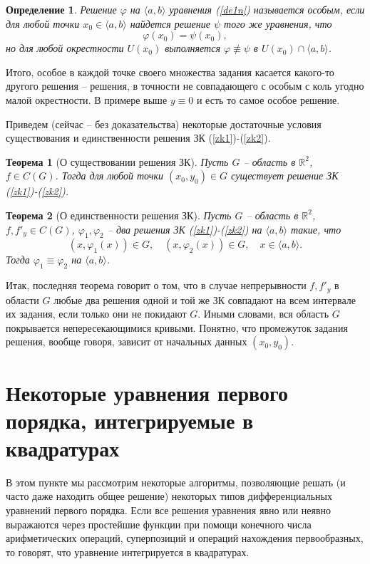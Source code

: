 \documentclass[a4paper,14pt]{extarticle}
\newtheorem{theorem}{Теорема}[subsection]
\newtheorem{definition}{Определение}[subsection]
\begin{document}
\begin{definition}
Решение $\varphi$ на $\langle a, b \rangle$ уравнения (\ref{de1n}) называется особым, если для любой точки $x_0 \in \langle a, b \rangle$ найдется решение $\psi$ того же уравнения, что
$$
\varphi(x_0) = \psi(x_0),
$$
но для любой окрестности $U(x_0)$ выполняется $\varphi \not\equiv \psi$ в $U(x_0) \cap \langle a, b \rangle$.
\end{definition}
Итого, особое в каждой точке своего множества задания касается какого-то другого решения -- решения, в точности не совпадающего с особым с коль угодно малой окрестности. В примере выше $y \equiv 0$ и есть то самое особое решение.

Приведем (сейчас -- без доказательства) некоторые достаточные условия существования и единственности решения ЗК (\ref{zk1})-(\ref{zk2}).
\begin{theorem}[О существовании решения ЗК]
	Пусть $G$ -- область в $\mathbb R^2$, $f \in C(G)$. Тогда для любой точки $(x_0, y_0) \in G$ существует решение ЗК (\ref{zk1})-(\ref{zk2}).
\end{theorem}
\begin{theorem}[О единственности решения ЗК]
	Пусть $G$ -- область в $\mathbb R^2$, $f, f'_y \in C(G)$, $\varphi_1, \varphi_2$ -- два решения ЗК (\ref{zk1})-(\ref{zk2}) на $ \langle a, b \rangle$ такие, что
	$$
	(x, \varphi_1(x)) \in G, \quad (x, \varphi_2(x)) \in G, \quad x \in \langle a, b \rangle.
	$$
Тогда $\varphi_1 \equiv \varphi_2$ на $\langle a, b \rangle$.
\end{theorem}
Итак, последняя теорема говорит о том, что в случае непрерывности $f, f'_y$ в области $G$ любые два решения одной и той же ЗК совпадают на всем интервале их задания, если только они не покидают $G$. Иными словами, вся область $G$ покрывается непересекающимися кривыми. Понятно, что промежуток задания решения, вообще говоря, зависит от начальных данных $(x_0, y_0)$.
\section{Некоторые уравнения первого порядка, интегрируемые в квадратурах}
В этом пункте мы рассмотрим некоторые алгоритмы, позволяющие решать (и часто даже находить общее решение) некоторых типов дифференциальных уравнений первого порядка. Если все решения уравнения явно или неявно выражаются через простейшие функции при помощи конечного числа арифметических операций, суперпозиций и операций нахождения первообразных, то говорят, что уравнение интегрируется в квадратурах.
\end{document}
